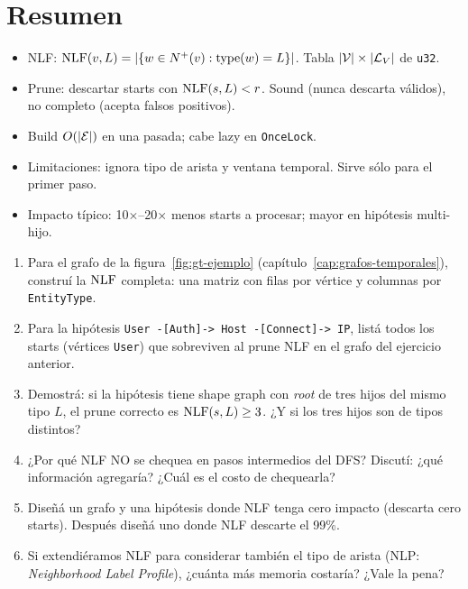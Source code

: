 \section{Resumen}

\begin{itemize}
    \item NLF: \(\mathrm{NLF}(v, L) = |\{w \in N^{+}(v) : \mathrm{type}(w)
    = L\}|\). Tabla \(|\mathcal{V}| \times |\mathcal{L}_V|\) de \texttt{u32}.
    \item Prune: descartar starts con \(\mathrm{NLF}(s, L) < r\). Sound
    (nunca descarta válidos), no completo (acepta falsos
    positivos).
    \item Build \(O(|\mathcal{E}|)\) en una pasada; cabe lazy en
    \texttt{OnceLock}.
    \item Limitaciones: ignora tipo de arista y ventana temporal.
    Sirve sólo para el primer paso.
    \item Impacto típico: 10\(\times\)--20\(\times\) menos starts a
    procesar; mayor en hipótesis multi-hijo.
\end{itemize}

\begin{ejercicios}
\begin{enumerate}
    \item \starred{} Para el grafo de la
    figura~\ref{fig:gt-ejemplo} (capítulo~\ref{cap:grafos-temporales}),
    construí la \(\mathrm{NLF}\) completa: una matriz con filas por vértice
    y columnas por \texttt{EntityType}.

    \item Para la hipótesis
    \texttt{User -[Auth]-> Host -[Connect]-> IP}, listá todos los
    starts (vértices \texttt{User}) que sobreviven al prune NLF en
    el grafo del ejercicio anterior.

    \item \starred{} Demostrá: si la hipótesis tiene shape graph
    con \emph{root} de tres hijos del mismo tipo \(L\), el prune
    correcto es \(\mathrm{NLF}(s, L) \geq 3\). ¿Y si los tres hijos son de
    tipos distintos?

    \item ¿Por qué NLF NO se chequea en pasos intermedios del DFS?
    Discutí: ¿qué información agregaría? ¿Cuál es el costo de
    chequearla?

    \item Diseñá un grafo y una hipótesis donde NLF tenga cero
    impacto (descarta cero starts). Después diseñá uno donde NLF
    descarte el 99\%.

    \item Si extendiéramos NLF para considerar también el tipo de
    arista (NLP: \emph{Neighborhood Label Profile}), ¿cuánta más
    memoria costaría? ¿Vale la pena?
\end{enumerate}
\end{ejercicios}
